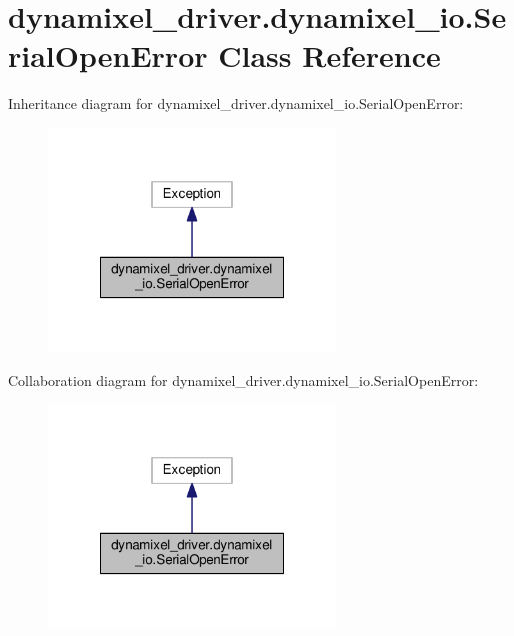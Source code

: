 \hypertarget{classdynamixel__driver_1_1dynamixel__io_1_1_serial_open_error}{}\section{dynamixel\+\_\+driver.\+dynamixel\+\_\+io.\+Serial\+Open\+Error Class Reference}
\label{classdynamixel__driver_1_1dynamixel__io_1_1_serial_open_error}


Inheritance diagram for dynamixel\+\_\+driver.\+dynamixel\+\_\+io.\+Serial\+Open\+Error\+:
\nopagebreak
\begin{figure}[H]
\begin{center}
\leavevmode
\includegraphics[width=216pt]{d8/dd3/classdynamixel__driver_1_1dynamixel__io_1_1_serial_open_error__inherit__graph}
\end{center}
\end{figure}


Collaboration diagram for dynamixel\+\_\+driver.\+dynamixel\+\_\+io.\+Serial\+Open\+Error\+:
\nopagebreak
\begin{figure}[H]
\begin{center}
\leavevmode
\includegraphics[width=216pt]{de/d1e/classdynamixel__driver_1_1dynamixel__io_1_1_serial_open_error__coll__graph}
\end{center}
\end{figure}
